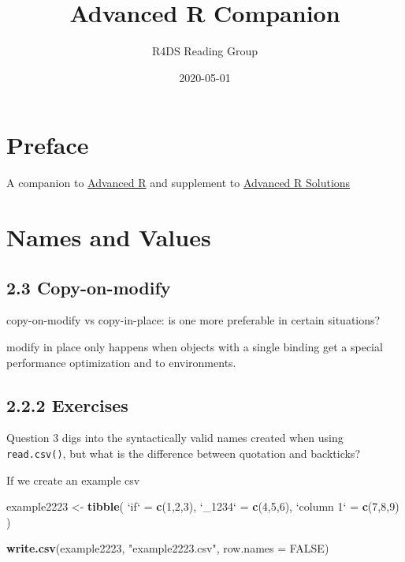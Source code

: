 \documentclass[]{book}
\title{Advanced R Companion}
\author{R4DS Reading Group}
\date{2020-05-01}
\newenvironment{Shaded}{\begin{snugshade}}{\end{snugshade}}
\newcommand{\DataTypeTok}[1]{\textcolor[rgb]{0.13,0.29,0.53}{#1}}
\newcommand{\DecValTok}[1]{\textcolor[rgb]{0.00,0.00,0.81}{#1}}
\newcommand{\KeywordTok}[1]{\textcolor[rgb]{0.13,0.29,0.53}{\textbf{#1}}}
\newcommand{\NormalTok}[1]{#1}
\newcommand{\OtherTok}[1]{\textcolor[rgb]{0.56,0.35,0.01}{#1}}
\newcommand{\StringTok}[1]{\textcolor[rgb]{0.31,0.60,0.02}{#1}}
\begin{document}
\maketitle

{
\setcounter{tocdepth}{1}
\tableofcontents
}
\hypertarget{preface}{%
\chapter{Preface}\label{preface}}

A companion to \href{https://adv-r.hadley.nz/rcpp.html\#acknowledgments}{Advanced R} and supplement to \href{https://advanced-r-solutions.rbind.io/names-and-values.html\#copy-on-modify}{Advanced R Solutions}

\hypertarget{names-and-values}{%
\chapter{Names and Values}\label{names-and-values}}

\hypertarget{copy-on-modify}{%
\section*{2.3 Copy-on-modify}\label{copy-on-modify}}

copy-on-modify vs copy-in-place: is one more preferable in certain situations?

modify in place only happens when objects with a single binding get a special performance optimization and to environments.

\hypertarget{exercises}{%
\section*{2.2.2 Exercises}\label{exercises}}

Question 3 digs into the syntactically valid names created when using \texttt{read.csv()}, but what is the difference between quotation and backticks?

If we create an example csv

\begin{Shaded}
\begin{Highlighting}[]
\NormalTok{example2223 <-}\StringTok{ }\KeywordTok{tibble}\NormalTok{(}
  \StringTok{`}\DataTypeTok{if}\StringTok{`}\NormalTok{ =}\StringTok{ }\KeywordTok{c}\NormalTok{(}\DecValTok{1}\NormalTok{,}\DecValTok{2}\NormalTok{,}\DecValTok{3}\NormalTok{),}
  \StringTok{`}\DataTypeTok{_1234}\StringTok{`}\NormalTok{ =}\StringTok{ }\KeywordTok{c}\NormalTok{(}\DecValTok{4}\NormalTok{,}\DecValTok{5}\NormalTok{,}\DecValTok{6}\NormalTok{),}
  \StringTok{`}\DataTypeTok{column 1}\StringTok{`}\NormalTok{ =}\StringTok{ }\KeywordTok{c}\NormalTok{(}\DecValTok{7}\NormalTok{,}\DecValTok{8}\NormalTok{,}\DecValTok{9}\NormalTok{)}
\NormalTok{)}

\KeywordTok{write.csv}\NormalTok{(example2223, }\StringTok{"example2223.csv"}\NormalTok{, }\DataTypeTok{row.names =} \OtherTok{FALSE}\NormalTok{)}
\end{Highlighting}
\end{Shaded}
\end{document}
